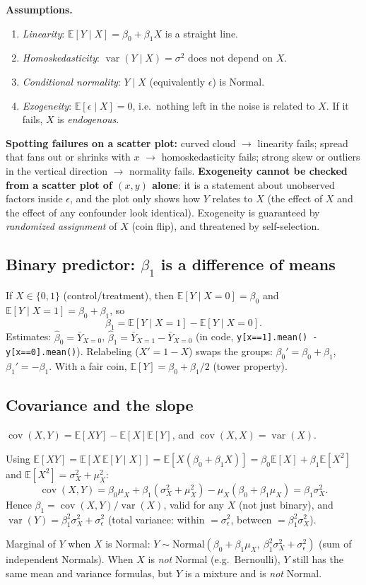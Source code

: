 \documentclass[11pt]{article}
\newcommand{\E}{\mathbb{E}}
\newcommand{\Var}{\operatorname{var}}
\newcommand{\Cov}{\operatorname{cov}}
\newcommand{\given}{\mid}
\newcommand{\Norm}{\text{Normal}}
\newcommand{\py}[1]{\texttt{#1}}
\begin{document}
\textbf{Assumptions.}
\begin{enumerate}[leftmargin=*,itemsep=1pt]
  \item \emph{Linearity}: $\E[Y\given X]=\beta_0+\beta_1X$ is a straight line.
  \item \emph{Homoskedasticity}: $\Var(Y\given X)=\sigma^2$ does not depend on $X$.
  \item \emph{Conditional normality}: $Y\given X$ (equivalently $\epsilon$) is Normal.
  \item \emph{Exogeneity}: $\E[\epsilon\given X]=0$, i.e.\ nothing left in the noise is related to $X$. If it fails, $X$ is \emph{endogenous}.
\end{enumerate}
\textbf{Spotting failures on a scatter plot:} curved cloud $\to$ linearity fails; spread that fans out or shrinks with $x$ $\to$ homoskedasticity fails;
strong skew or outliers in the vertical direction $\to$ normality fails. \textbf{Exogeneity cannot be checked from a scatter plot of $(x,y)$ alone}:
it is a statement about unobserved factors inside $\epsilon$, and the plot only shows how $Y$ relates to $X$ (the effect of $X$ and the effect of any confounder look identical).
Exogeneity is guaranteed by \emph{randomized assignment} of $X$ (coin flip), and threatened by self-selection.

\subsection{Binary predictor: $\beta_1$ is a difference of means}
If $X\in\{0,1\}$ (control/treatment), then $\E[Y\given X=0]=\beta_0$ and $\E[Y\given X=1]=\beta_0+\beta_1$, so
\[
\boxed{\ \beta_1=\E[Y\given X=1]-\E[Y\given X=0].\ }
\]
Estimates: $\hat\beta_0=\bar Y_{X=0}$, $\hat\beta_1=\bar Y_{X=1}-\bar Y_{X=0}$ (in code, \py{y[x==1].mean() - y[x==0].mean()}).
Relabeling ($X'=1-X$) swaps the groups: $\beta_0'=\beta_0+\beta_1$, $\beta_1'=-\beta_1$.
With a fair coin, $\E[Y]=\beta_0+\beta_1/2$ (tower property).

\subsection{Covariance and the slope}
$\Cov(X,Y)=\E[XY]-\E[X]\E[Y]$, and $\Cov(X,X)=\Var(X)$.
\begin{keybox}[title={Key derivation: $\Cov(X,Y)=\beta_1\sigma_X^2$}]
Using $\E[XY]=\E[X\,\E[Y\given X]]=\E[X(\beta_0+\beta_1X)]=\beta_0\E[X]+\beta_1\E[X^2]$ and $\E[X^2]=\sigma_X^2+\mu_X^2$:
\[
\Cov(X,Y)=\beta_0\mu_X+\beta_1(\sigma_X^2+\mu_X^2)-\mu_X(\beta_0+\beta_1\mu_X)=\beta_1\sigma_X^2.
\]
Hence $\beta_1=\Cov(X,Y)/\Var(X)$, valid for any $X$ (not just binary), and
$\Var(Y)=\beta_1^2\sigma_X^2+\sigma_\epsilon^2$ (total variance: within $=\sigma_\epsilon^2$, between $=\beta_1^2\sigma_X^2$).
\end{keybox}
Marginal of $Y$ when $X$ is Normal: $Y\sim\Norm(\beta_0+\beta_1\mu_X,\ \beta_1^2\sigma_X^2+\sigma_\epsilon^2)$ (sum of independent Normals).
When $X$ is \emph{not} Normal (e.g.\ Bernoulli), $Y$ still has the same mean and variance formulas, but $Y$ is a mixture and is \emph{not} Normal.
\end{document}
